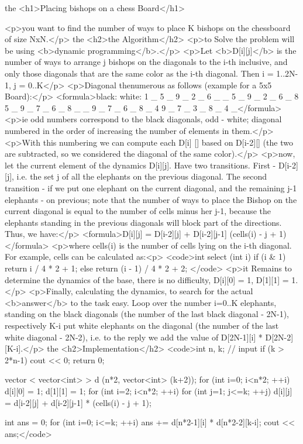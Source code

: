 the <h1>Placing bishops on a chess Board</h1>

<p>you want to find the number of ways to place K bishops on the chessboard of size NxN.</p>
the <h2>the Algorithm</h2>
<p>to Solve the problem will be using <b>dynamic programming</b>.</p>
<p>Let <b>D[i][j]</b> is the number of ways to arrange j bishops on the diagonals to the i-th inclusive, and only those diagonals that are the same color as the i-th diagonal. Then i = 1..2N-1, j = 0..K</p>
<p>Diagonal thenumerous as follows (example for a 5x5 Board):</p>
<formula>black: white:
1 _ 5 _ 9 _ 2 _ 6 _
_ 5 _ 9 _ 2 _ 6 _ 8
5 _ 9 _ 7 _ 6 _ 8 _ 
_ 9 _ 7 _ 6 _ 8 _ 4
9 _ 7 _ 3 _ 8 _ 4 _</formula>
<p>ie odd numbers correspond to the black diagonals, odd - white; diagonal numbered in the order of increasing the number of elements in them.</p>
<p>With this numbering we can compute each D[i] [] based on D[i-2][] (the two are subtracted, so we considered the diagonal of the same color).</p>
<p>now, let the current element of the dynamics D[i][j]. Have two transitions. First - D[i-2][j], i.e. the set j of all the elephants on the previous diagonal. The second transition - if we put one elephant on the current diagonal, and the remaining j-1 elephants - on previous; note that the number of ways to place the Bishop on the current diagonal is equal to the number of cells minus her j-1, because the elephants standing in the previous diagonals will block part of the directions. Thus, we have:</p>
<formula>D[i][j] = D[i-2][j] + D[i-2][j-1] (cells(i) - j + 1)</formula>
<p>where cells(i) is the number of cells lying on the i-th diagonal. For example, cells can be calculated as:<p>
<code>int select (int i) {
if (i & 1)
return i / 4 * 2 + 1;
else
return (i - 1) / 4 * 2 + 2;
}</code>
<p>it Remains to determine the dynamics of the base, there is no difficulty, D[i][0] = 1, D[1][1] = 1.</p>
<p>Finally, calculating the dynamics, to search for the actual <b>answer</b> to the task easy. Loop over the number i=0..K elephants, standing on the black diagonals (the number of the last black diagonal - 2N-1), respectively K-i put white elephants on the diagonal (the number of the last white diagonal - 2N-2), i.e. to the reply we add the value of D[2N-1][i] * D[2N-2][K-i].</p>
the <h2>Implementation</h2>
<code>int n, k; // input
if (k > 2*n-1) {
cout << 0;
return 0;
}

vector < vector<int> > d (n*2, vector<int> (k+2));
for (int i=0; i<n*2; ++i)
d[i][0] = 1;
d[1][1] = 1;
for (int i=2; i<n*2; ++i)
for (int j=1; j<=k; ++j)
d[i][j] = d[i-2][j] + d[i-2][j-1] * (cells(i) - j + 1);

int ans = 0;
for (int i=0; i<=k; ++i)
ans += d[n*2-1][i] * d[n*2-2][k-i];
cout << ans;</code>